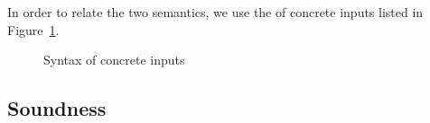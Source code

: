 %
%
%
%
%
%

In order to relate the two semantics, we use the of concrete inputs listed in Figure~\ref{fig:inputsConcrete}.

\begin{figure}
\caption{Syntax of concrete inputs}
\label{fig:inputsConcrete}
\end{figure}


\subsection{Soundness}






